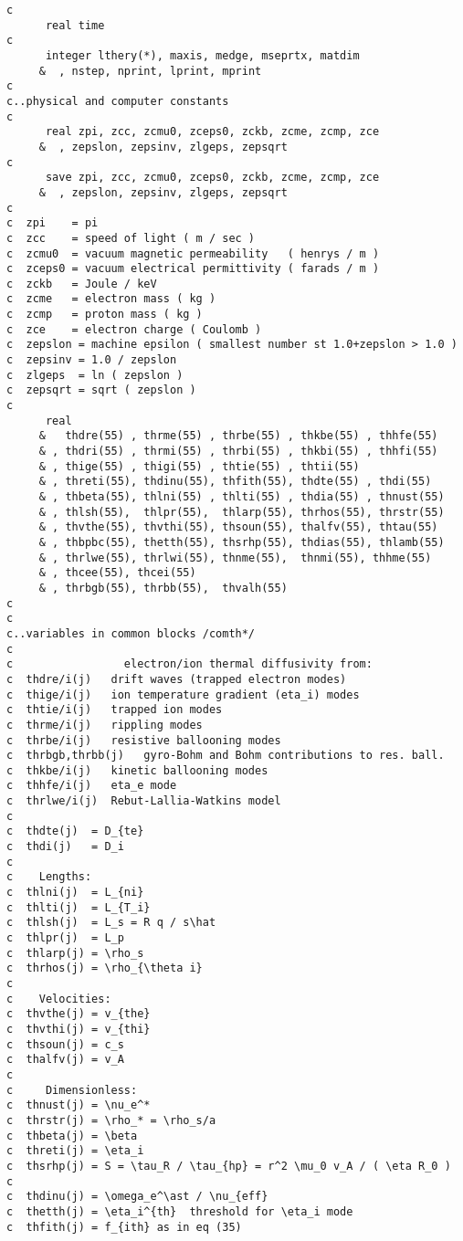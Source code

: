 \begin{verbatim}
c
      real time
c
      integer lthery(*), maxis, medge, mseprtx, matdim
     &  , nstep, nprint, lprint, mprint
c
c..physical and computer constants
c
      real zpi, zcc, zcmu0, zceps0, zckb, zcme, zcmp, zce
     &  , zepslon, zepsinv, zlgeps, zepsqrt
c
      save zpi, zcc, zcmu0, zceps0, zckb, zcme, zcmp, zce
     &  , zepslon, zepsinv, zlgeps, zepsqrt
c
c  zpi    = pi
c  zcc    = speed of light ( m / sec )
c  zcmu0  = vacuum magnetic permeability   ( henrys / m )
c  zceps0 = vacuum electrical permittivity ( farads / m )
c  zckb   = Joule / keV
c  zcme   = electron mass ( kg )
c  zcmp   = proton mass ( kg )
c  zce    = electron charge ( Coulomb )
c  zepslon = machine epsilon ( smallest number st 1.0+zepslon > 1.0 )
c  zepsinv = 1.0 / zepslon
c  zlgeps  = ln ( zepslon )
c  zepsqrt = sqrt ( zepslon )
c
      real
     &   thdre(55) , thrme(55) , thrbe(55) , thkbe(55) , thhfe(55)
     & , thdri(55) , thrmi(55) , thrbi(55) , thkbi(55) , thhfi(55)
     & , thige(55) , thigi(55) , thtie(55) , thtii(55)
     & , threti(55), thdinu(55), thfith(55), thdte(55) , thdi(55)
     & , thbeta(55), thlni(55) , thlti(55) , thdia(55) , thnust(55)
     & , thlsh(55),  thlpr(55),  thlarp(55), thrhos(55), thrstr(55)
     & , thvthe(55), thvthi(55), thsoun(55), thalfv(55), thtau(55)
     & , thbpbc(55), thetth(55), thsrhp(55), thdias(55), thlamb(55)
     & , thrlwe(55), thrlwi(55), thnme(55),  thnmi(55), thhme(55)
     & , thcee(55), thcei(55)
     & , thrbgb(55), thrbb(55),  thvalh(55)
c
c
c..variables in common blocks /comth*/
c
c                 electron/ion thermal diffusivity from:
c  thdre/i(j)   drift waves (trapped electron modes)
c  thige/i(j)   ion temperature gradient (eta_i) modes
c  thtie/i(j)   trapped ion modes
c  thrme/i(j)   rippling modes
c  thrbe/i(j)   resistive ballooning modes
c  thrbgb,thrbb(j)   gyro-Bohm and Bohm contributions to res. ball.
c  thkbe/i(j)   kinetic ballooning modes
c  thhfe/i(j)   eta_e mode
c  thrlwe/i(j)  Rebut-Lallia-Watkins model
c
c  thdte(j)  = D_{te}
c  thdi(j)   = D_i
c
c    Lengths:
c  thlni(j)  = L_{ni}
c  thlti(j)  = L_{T_i}
c  thlsh(j)  = L_s = R q / s\hat
c  thlpr(j)  = L_p
c  thlarp(j) = \rho_s
c  thrhos(j) = \rho_{\theta i}
c
c    Velocities:
c  thvthe(j) = v_{the}
c  thvthi(j) = v_{thi}
c  thsoun(j) = c_s
c  thalfv(j) = v_A
c
c     Dimensionless:
c  thnust(j) = \nu_e^*
c  thrstr(j) = \rho_* = \rho_s/a
c  thbeta(j) = \beta
c  threti(j) = \eta_i
c  thsrhp(j) = S = \tau_R / \tau_{hp} = r^2 \mu_0 v_A / ( \eta R_0 )
c
c  thdinu(j) = \omega_e^\ast / \nu_{eff}
c  thetth(j) = \eta_i^{th}  threshold for \eta_i mode
c  thfith(j) = f_{ith} as in eq (35)

\end{verbatim}
